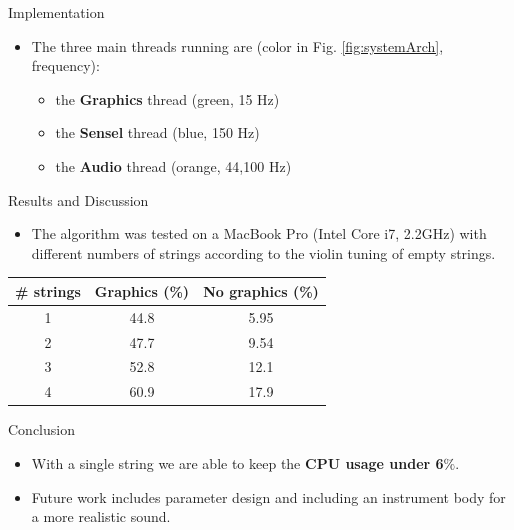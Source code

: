 \documentclass[a0paper,portrait]{baposter}
\let\oldbf\textbf
\renewcommand{\textbf}[1]{\textcolor{aaublue1}{\oldbf{#1}}}
\begin{document}
\begin{poster}
\begin{posterbox}[name=implementation,column=2,row=0]{Implementation}
\begin{itemize}
\begin{itemize}
        \item the \textbf{main application class} that moderates between these and the auditory and visual outputs.
    \end{itemize}
    \item The three main threads running are (color in Fig. \ref{fig:systemArch}, frequency):
    \begin{itemize}
        \item the \textbf{Graphics} thread (green, 15 Hz)
        \item the \textbf{Sensel} thread (blue, 150 Hz)
        \item the \textbf{Audio} thread (orange, 44,100 Hz)
    \end{itemize}
\end{itemize}
\end{posterbox}

\begin{posterbox}[name=discussion,column=2,below=implementation]{Results and Discussion}
\begin{itemize}
    \item The algorithm was tested on a MacBook Pro (Intel Core i7, 2.2GHz) with different numbers of strings according to the violin tuning of empty strings. 
\end{itemize}
\vspace{-1.6em}
  \begin{center}
	\centering
  \begin{tabular}{|c|c|c|}\hline
   
   \# strings & Graphics (\%) & No graphics (\%)\\
    \hline
    1 & 44.8 & 5.95\\
    2 & 47.7 & 9.54\\
    3 & 52.8 & 12.1 \\
    4 & 60.9 & 17.9\\
    \hline
 \end{tabular}
  \label{tab:results}
\end{center}
\end{posterbox}

\begin{posterbox}[name=conclusion,column=2,below=discussion]{Conclusion}
  \begin{itemize}
    \item With a single string we are able to keep the \textbf{CPU usage under 6$\mathbf{\%}$}.
    \item Future work includes parameter design and including an instrument body for a more realistic sound. 
  \end{itemize}
\end{posterbox}


\end{poster}
\end{document}
